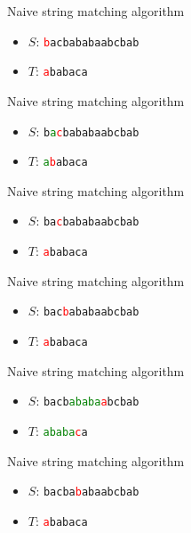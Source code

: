 \begin{frame}{Naive string matching algorithm}
    \begin{itemize}
        \item $S$: \texttt{\textcolor{red}{b}acbababaabcbab}
        \item $T$: \phantom{\texttt{}}\texttt{\textcolor{red}{a}babaca}
    \end{itemize}
\end{frame}
\begin{frame}{Naive string matching algorithm}
    \begin{itemize}
        \item $S$: \texttt{b\textcolor{green}{a}\textcolor{red}{c}bababaabcbab}
        \item $T$: \texttt{\textcolor{green}{a}\textcolor{red}{b}abaca}
    \end{itemize}
\end{frame}
\begin{frame}{Naive string matching algorithm}
    \begin{itemize}
        \item $S$: \texttt{ba\textcolor{red}{c}bababaabcbab}
        \item $T$: \texttt{\textcolor{red}{a}babaca}
    \end{itemize}
\end{frame}
\begin{frame}{Naive string matching algorithm}
    \begin{itemize}
        \item $S$: \texttt{bac\textcolor{red}{b}ababaabcbab}
        \item $T$: \texttt{\textcolor{red}{a}babaca}
    \end{itemize}
\end{frame}
\begin{frame}{Naive string matching algorithm}
    \begin{itemize}
        \item $S$: \texttt{bacb\textcolor{green}{ababa}\textcolor{red}{a}bcbab}
        \item $T$: \texttt{\textcolor{green}{ababa}\textcolor{red}{c}a}
    \end{itemize}
\end{frame}
\begin{frame}{Naive string matching algorithm}
    \begin{itemize}
        \item $S$: \texttt{bacba\textcolor{red}{b}abaabcbab}
        \item $T$: \texttt{\textcolor{red}{a}babaca}
    \end{itemize}
\end{frame}
